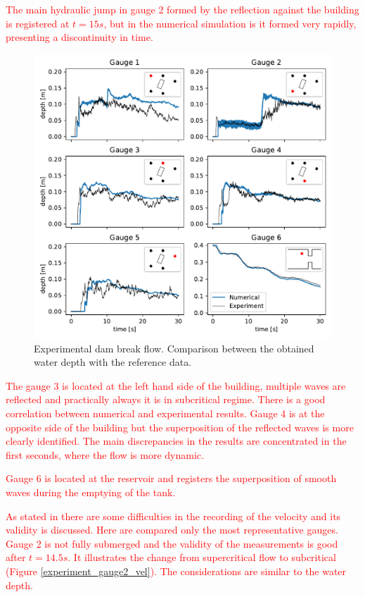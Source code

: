 \documentclass[a4paper,12pt]{elsarticle}
\newcommand{\Miguel}[1]{\textcolor{red}{#1}}
\begin{document}
\Miguel{
The main hydraulic jump in gauge 2 formed by the reflection against the building is registered at $t=15s$, but in the numerical simulation is it formed very rapidly, presenting a discontinuity in time.
}

\begin{figure}
\centering
\includegraphics[width=\textwidth]{img/exp/gauges.pdf}
\caption{Experimental dam break flow. Comparison between the obtained water depth with the reference data.}
\label{experiment_gauges}
\end{figure}

\Miguel{
The gauge 3 is located at the left hand side of the building, multiple waves are reflected and practically always it is in subcritical regime. There is a good correlation between numerical and experimental results. Gauge 4 is at the opposite side of the building but the superposition of the reflected waves is more clearly identified. The main discrepancies in the results are concentrated in the first seconds, where the flow is more dynamic.
}

\Miguel{
Gauge 6 is located at the reservoir and registers the superposition of smooth waves during the emptying of the tank.
}

\Miguel{
As stated in \cite{soares2007} there are some difficulties in the recording of the velocity and its validity is discussed. Here are compared only the most representative gauges. Gauge 2 is not fully submerged and the validity of the measurements is good after $t=14.5s$. It illustrates the change from supercritical flow to subcritical (Figure \ref{experiment_gauge2_vel}). The considerations are similar to the water depth.
}
\end{document}
